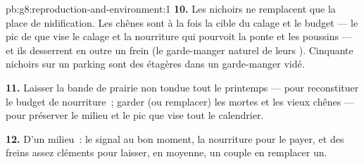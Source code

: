 \begin{solution}{pb:g8:reproduction-and-environment:1}
\textbf{10.} Les nichoirs ne remplacent que la place de
nidification. Les chênes sont à la fois la cible du calage et le
budget --- le pic de  que vise le calage et la nourriture
qui pourvoit la ponte et les poussins --- et ils desserrent en
outre un frein (le garde-manger naturel de leurs ).
Cinquante nichoirs sur un parking sont des étagères dans un
garde-manger vidé.

\textbf{11.} Laisser la bande de prairie non tondue tout le
printemps --- pour reconstituer le budget de nourriture~; garder (ou
remplacer) les  mortes et les vieux chênes --- pour
préserver le milieu et le pic que vise tout le calendrier.

\textbf{12.} D'un milieu~: le signal au bon moment, la nourriture
pour le payer, et des freins assez cléments pour laisser, en
moyenne, un couple en remplacer un.
\end{solution}
